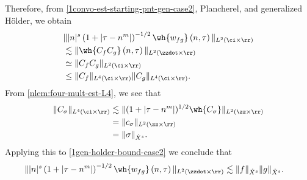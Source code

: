 Therefore, from \eqref{1convo-est-starting-pnt-gen-case2}, Plancherel, and generalized 
H\"{o}lder, we obtain
%
%
\begin{equation}
	\label{1gen-holder-bound-case2}
	\begin{split}
		& \| |n|^s \left( 1 + | \tau - n^m | \right )^{-1/2}  \wh{w_{fg}}\left( 
		n, \tau \right) \|_{L^2(\ci \times \rr)}
		\\
		& \lesssim \|\wh{C_f C_g }\left( n, \tau \right) 
		\|_{L^2\left( \zzdot \times \rr \right)}
		\\
		& \simeq \|C_f C_g \|_{L^2\left( \ci \times \rr \right)}
		\\
		& \le \|C_f \|_{L^4(\ci \times \rr)} \|C_g \|_{L^4(\ci \times \rr)}.
	\end{split}
\end{equation}
%
From \cref{nlem:four-mult-est-L4}, we see that
%
%
\begin{equation}
	\label{1four-mult-conseq-gen-case2}
	\begin{split}
		\|C_\sigma\|_{L^4(\ci \times \rr)} 
		& \lesssim \|(1 + | \tau - n^m |)^{1/2} \wh{C_\sigma}
		\|_{L^2(\zz \times \rr)}
		\\
		& = \|c_{\sigma} \|_{L^2(\zz \times \rr)} 
		\\
		& = \|\sigma \|_{\dot{X}^s}. 
	\end{split}
\end{equation}
%
%
Applying this to \eqref{1gen-holder-bound-case2} we
conclude that
\begin{equation*}
	\begin{split}
		\| |n|^s \left( 1 + | \tau - n^m | \right ) ^{-1/2} \wh{w_{fg}}\left( 
		n, \tau \right) \|_{L^2(\zzdot \times \rr)}
		& \lesssim \|f\|_{\dot{X}^s} \|g\|_{\dot{X}^s}.
	\end{split}
\end{equation*}
%
%
%
